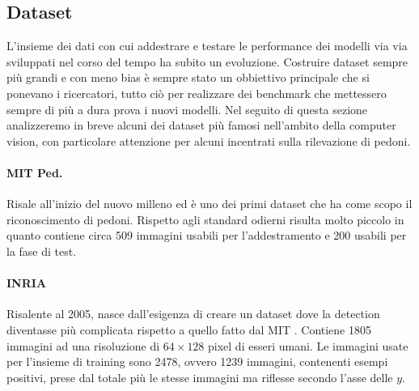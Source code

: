 \subsection{Dataset}
L'insieme dei dati con cui addestrare e testare le performance dei modelli via via sviluppati nel corso del tempo ha subito un evoluzione. Costruire dataset sempre più grandi e con meno bias è sempre stato un obbiettivo principale che si ponevano i ricercatori, tutto ciò per realizzare dei benchmark che mettessero sempre di più a dura prova i nuovi modelli. Nel seguito di questa sezione analizzeremo in breve alcuni dei dataset più famosi nell'ambito della computer vision, con particolare attenzione per alcuni incentrati sulla rilevazione di pedoni. 
\paragraph{MIT Ped.} Risale all'inizio del nuovo milleno ed è uno dei primi dataset che ha come scopo il riconoscimento di pedoni. Rispetto agli standard odierni risulta molto piccolo in quanto contiene circa 509 immagini usabili per l'addestramento e 200 usabili per la fase di test. \cite{papageorgiou2000trainable} 
\paragraph{INRIA} Risalente al 2005, nasce dall'esigenza di creare un dataset dove la detection diventasse più complicata rispetto a quello fatto dal MIT \cite{dalal2005histograms}. Contiene 1805 immagini ad una risoluzione di $64 \times 128$ pixel di esseri umani. Le immagini usate per l'insieme di training sono 2478, ovvero 1239 immagini, contenenti esempi positivi, prese dal totale più le stesse immagini ma riflesse secondo l'asse delle $y$.

